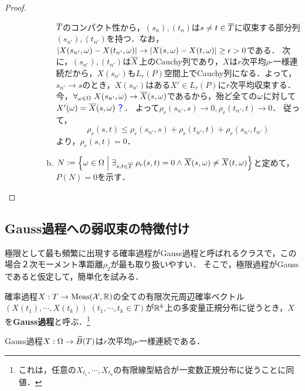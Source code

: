 \documentclass[uplatex,dvipdfmx]{jsreport}
\begin{document}
\begin{proof}
\begin{enumerate}
\begin{description}
\begin{enumerate}[(a)]
                $\overline{T}$のコンパクト性から，$(s_n),(t_n)$は$s\ne t\in\overline{T}$に収束する部分列$(s_{n'}),(t_{n'})$を持つ．なお，$\lvert X(s_{n'},\omega)-X(t_{n'},\omega)\rvert\to\lvert X(s,\omega)-X(t,\omega)\rvert\ge\epsilon>0$である．
                次に，$(s_{n'}),(t_{n'})$は$\overline{X}$上のCauchy列であり，$X$は$r$次平均$\rho$-一様連続だから，$X(s_{n'})$も$L_r(P)$空間上でCauchy列になる．よって，$s_{n'}\to s$のとき，$X(s_{n'})$はある$X'\in L_r(P)$に$r$次平均収束する．
                今，$\forall_{\omega\in\Omega}\;X(s_{n'},\omega)\to\overline{X}(s,\omega)$であるから，殆ど全ての$\omega$に対して$X'(\omega)=\overline{X}(s,\omega)$\textcolor{blue}{？}．
                よって$\rho_r(s_{n'},s)\to 0,\rho_r(t_{n'},t)\to 0$．
                従って，
                \[\rho_r(s,t)\le\rho_r(s_{n'},s)+\rho_r(t_{n'},t)+\rho_r(s_{n'},t_{n'})\]
                より，$\rho_r(s,t)=0$．
                \item $N:=\left\{\omega\in\Omega\;\middle|\;\exists_{s,t\in\overline{T}}\;\rho_r(s,t)=0\land \overline{X}(s,\omega)\ne\overline{X}(t,\omega)\right\}$と定めて，$P(N)=0$を示す．
                
            \end{enumerate}
        \end{description}
    \end{enumerate}
\end{proof}

\subsection{Gauss過程への弱収束の特徴付け}

\begin{tcolorbox}[colframe=ForestGreen, colback=ForestGreen!10!white,breakable,colbacktitle=ForestGreen!40!white,coltitle=black,fonttitle=\bfseries\sffamily,
title=]
    極限として最も頻繁に出現する確率過程がGauss過程と呼ばれるクラスで，この場合２次モーメント準距離$\rho_2$が最も取り扱いやすい．
    そこで，極限過程がGaussであると仮定して，簡単化を試みる．
\end{tcolorbox}

\begin{definition}\label{def-Gaussian-process}
    確率過程$X:T\to\mathrm{Meas}(\mathcal{X},\mathbb{R})$の全ての有限次元周辺確率ベクトル$(X(t_1),\cdots,X(t_k))\;(t_1,\cdots,t_k\in T)$が$\mathbb{R}^k$上の多変量正規分布に従うとき，$X$を\textbf{Gauss過程}と呼ぶ．\footnote{これは，任意の$X_{t_1},\cdots,X_{t_k}$の有限線型結合が一変数正規分布に従うことに同値．}
\end{definition}

\begin{lemma}\label{lemma-Gauss-process-is-continuous}
    Gauss過程$X:\Omega\to\widetilde{B}(T)$は$r$次平均$\rho$-一様連続である．
\end{lemma}
\end{document}
